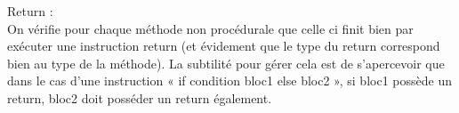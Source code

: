 Return :\\
On vérifie pour chaque méthode non procédurale que celle ci finit bien par
exécuter une instruction return (et évidement que le type du return correspond
bien au type de la méthode). La subtilité pour gérer cela est de s'apercevoir
que dans le cas d'une instruction « if condition {bloc1} else {bloc2} », si
bloc1 possède un return, bloc2 doit posséder un return également.\\


